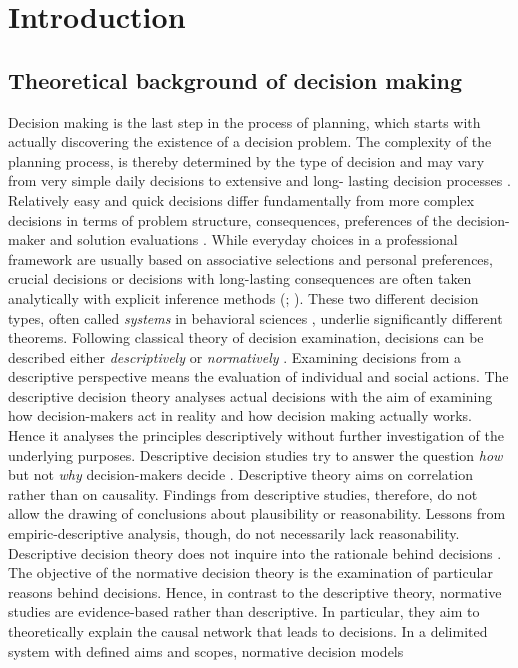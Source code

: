 
\chapter{Introduction}
\label{chap:intro}
\newpage
\section{Theoretical background of decision making}
\label{sec:intro:bg}
Decision making is the last step in the process of planning, which starts with actually discovering the existence of a decision problem. The complexity of the planning process, is thereby determined by the type of decision and may vary from very simple daily decisions to extensive and long- lasting decision processes \citep[p. 3-4]{kangas_2015}. Relatively easy and quick decisions differ fundamentally from more complex decisions in terms of problem structure, consequences, preferences of the decision-maker and solution evaluations \citep[p. 807-808]{keeney_1982}. While everyday choices in a professional framework are usually based on associative selections and personal preferences, crucial decisions or decisions with long-lasting consequences are often taken analytically with explicit inference methods (\citealp[p. 659, 672]{stanovich_2000}; \citealp[p. 3]{kangas_2015}). These two different decision types, often called \textit{systems} in behavioral sciences \citep[e.g.][p. 658]{stanovich_2000}, underlie significantly different theorems. Following classical theory of decision examination, decisions can be described either \textit{descriptively} or \textit{normatively} \citep[p. 6]{bitz_2005}. Examining decisions from a descriptive perspective means the evaluation of individual and social actions. The descriptive decision theory analyses actual decisions with the aim of examining how decision-makers act in reality and how decision making actually works. Hence it analyses the principles descriptively without further investigation of the underlying purposes. Descriptive decision studies try to answer the question \textit{how} but not \textit{why} decision-makers decide \citep[p. 499-501]{simon_1979}. Descriptive theory aims on correlation rather than on causality. Findings from descriptive studies, therefore, do not allow the drawing of conclusions about plausibility or reasonability. Lessons from empiric-descriptive analysis, though, do not necessarily lack reasonability. Descriptive decision theory does not inquire into the rationale behind decisions \citep[p. 500]{simon_1979}. The objective of the normative decision theory is the examination of particular reasons behind decisions. Hence, in contrast to the descriptive theory, normative studies are evidence-based rather than descriptive. In particular, they aim to theoretically explain the causal network that leads to decisions. In a delimited system with defined aims and scopes, normative decision models 